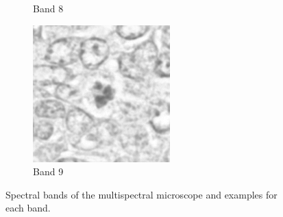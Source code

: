 \documentclass[10pt,twocolumn,letterpaper]{article}
\begin{document}
\begin{figure}[t]
\begin{subfigure}[b]{0.11\textwidth}
		\caption*{Band 8}
	\end{subfigure}
	\begin{subfigure}[b]{0.11\textwidth}
		\centering
		\includegraphics[width=\textwidth]{img/M03_00a_0908_m1.png}
		\caption*{Band 9}
	\end{subfigure}
	\caption{Spectral bands of the multispectral microscope and examples for each band.}
	\label{fig:spectral_bands}	
\end{figure}
\end{document}
